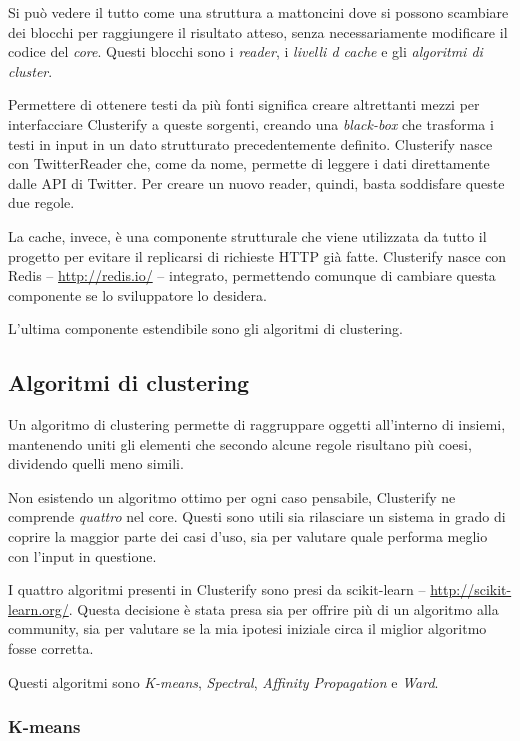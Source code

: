 	Si può vedere il tutto come una struttura a mattoncini dove si possono scambiare dei blocchi per raggiungere il risultato atteso, senza necessariamente modificare il codice del \emph{core}. Questi blocchi sono i \emph{reader}, i \emph{livelli d cache} e gli \emph{algoritmi di cluster}.
	
	Permettere di ottenere testi da più fonti significa creare altrettanti mezzi per interfacciare Clusterify a queste sorgenti, creando una \emph{black-box} che trasforma i testi in input in un dato strutturato precedentemente definito. Clusterify nasce con TwitterReader che, come da nome, permette di leggere i dati direttamente dalle API di Twitter. Per creare un nuovo reader, quindi, basta soddisfare queste due regole.

	La cache, invece, è una componente strutturale che viene utilizzata da tutto il progetto per evitare il replicarsi di richieste HTTP già fatte. Clusterify nasce con Redis -- \url{http://redis.io/} -- integrato, permettendo comunque di cambiare questa componente se lo sviluppatore lo desidera.

	L'ultima componente estendibile sono gli algoritmi di clustering.

	\subsection{Algoritmi di clustering}
		Un algoritmo di clustering permette di raggruppare oggetti all'interno di insiemi, mantenendo uniti gli elementi che secondo alcune regole risultano più coesi, dividendo quelli meno simili.

		Non esistendo un algoritmo ottimo per ogni caso pensabile, Clusterify ne comprende \emph{quattro} nel core. Questi sono utili sia rilasciare un sistema in grado di coprire la maggior parte dei casi d'uso, sia per valutare quale performa meglio con l'input in questione.

		I quattro algoritmi presenti in Clusterify sono presi da scikit-learn -- \url{http://scikit-learn.org/}. Questa decisione è stata presa sia per offrire più di un algoritmo alla community, sia per valutare se la mia ipotesi iniziale circa il miglior algoritmo fosse corretta. 

		Questi algoritmi sono \emph{K-means}, \emph{Spectral}, \emph{Affinity Propagation} e \emph{Ward}.

		\subsubsection{K-means}
			

